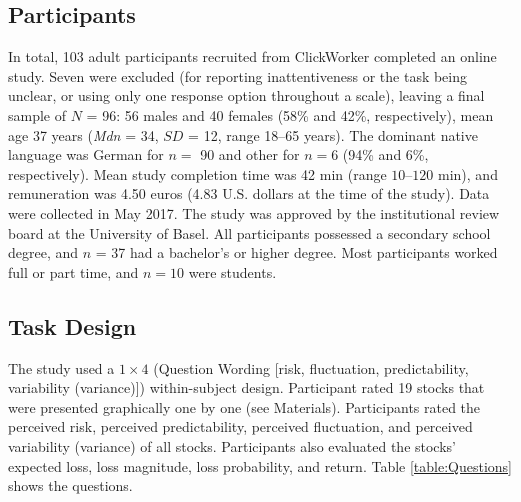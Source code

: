 \documentclass[a4paper,man, natbib,floatsintext]{apa6} %
\begin{document}
\subsection{Participants}
In total, 103 adult participants recruited from ClickWorker completed an online study. Seven were excluded (for reporting inattentiveness or the task being unclear, or using only one response option throughout a scale), leaving a final sample of $N$ = 96: 56 males and 40 females (58\% and 42\%, respectively), mean age 37 years (\textit{Mdn} = 34, $SD$ = 12, range 18--65 years). The dominant native language was German for $n =$ 90 and other for $n=6$ (94\% and 6\%, respectively). Mean study completion time was 42 min (range $10$--$120$ min), and remuneration was 4.50 euros (4.83 U.S. dollars at the time of the study). Data were collected in May 2017. The study was approved by the institutional review board at the University of Basel. All participants possessed a secondary school degree, and $n$ = 37 had a bachelor’s or higher degree. Most participants worked full or part time, and $n=10$ were students.

\subsection{Task Design}
The study used a $1 \times 4$ (Question Wording [risk, fluctuation, predictability, variability (variance)]) within-subject design. Participant rated 19 stocks that were presented graphically one by one (see Materials). Participants rated the perceived risk, perceived predictability, perceived fluctuation, and perceived variability (variance) of all stocks. Participants also evaluated the stocks' expected loss, loss magnitude, loss probability, and return. Table \ref{table:Questions} shows the questions.

\end{document}
